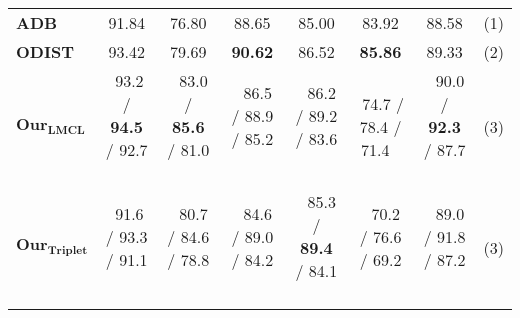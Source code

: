 \documentclass[runningheads]{llncs}
\begin{document}
\begin{table}[b]
\begin{adjustbox}{width=1\textwidth}
\begin{tabular}{l|cc|cc|cc|c}
\textbf{ADB}                & 91.84                & 76.80                & 88.65                & 85.00                & 83.92                & 88.58                & (1)  \\
\textbf{ODIST}              & 93.42                & 79.69                & \textbf{90.62}       & 86.52                & \textbf{85.86}       & 89.33                & (2)  \\ \hline
$\mathbf{Our}_\mathbf{LMCL}$    & \,\,93.2 /  \textbf{94.5} /  92.7 \,\,&\,\, 83.0 /  \textbf{85.6} /  81.0 \,\, &\,\, 86.5 /  88.9 /  85.2 \,\,&\,\, 86.2 /  89.2 /  83.6 \,\,& \,\,74.7 /  78.4 /  71.4 \,\,&\,\, 90.0 /  \textbf{92.3} /  87.7 \,\,& (3)  \\
$\mathbf{Our}_\mathbf{Triplet}$ & \,\,91.6 /  93.3 /  91.1 \,\,&\,\, 80.7 /  84.6 /  78.8 \,\,&\,\, 84.6 /  89.0 /  84.2 \,\,& \,\, 85.3 /  \textbf{89.4} /  84.1 \,\, & \,\, 70.2 /  76.6 /  69.2 \,\, & \,\, 89.0 /  91.8 /  87.2 \,\, & (3) 
\end{tabular}
\end{adjustbox}

\end{table}
\end{document}
